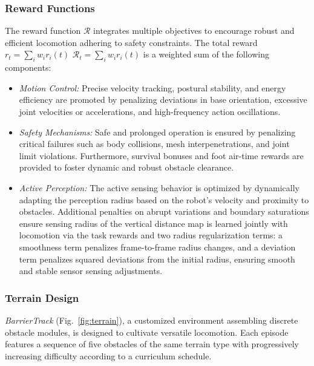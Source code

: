 \documentclass[letterpaper, 10 pt, conference]{ieeeconf/ieeeconf}
\providecommand{\DIFadd}[1]{{\protect\color{blue} \sf #1}} %
\providecommand{\DIFdel}[1]{{\protect\color{red} \scriptsize #1}} %
\providecommand{\DIFaddbegin}{} %
\providecommand{\DIFaddend}{} %
\providecommand{\DIFdelbegin}{} %
\providecommand{\DIFdelend}{} %
\begin{document}
\subsubsection{Reward Functions}
The reward function $\mathcal{R}$ integrates multiple objectives to encourage robust and efficient locomotion adhering to safety constraints. The total reward \DIFdelbegin \DIFdel{$r_t = \sum_i w_i r_i(t)$ }\DIFdelend \DIFaddbegin \DIFadd{$\mathcal{R}_t = \sum_i w_i r_i(t)$ }\DIFaddend is a weighted sum of the following components:

\begin{itemize}
    \item \textit{Motion Control:} Precise velocity tracking, postural stability, and energy efficiency are promoted by penalizing deviations in base orientation, excessive joint velocities or accelerations, and high-frequency action oscillations.

    \item \textit{Safety Mechanisms:} Safe and prolonged operation is ensured by penalizing critical failures such as body collisions, mesh interpenetrations, and joint limit violations. Furthermore, survival bonuses and foot air-time rewards are provided to foster dynamic and robust obstacle clearance.

    \item \textit{Active Perception:} The \DIFdelbegin \DIFdel{active sensing behavior is optimized by dynamically adapting the perception radius based on the robot's velocity and proximity to obstacles. Additional penalties on abrupt variations and boundary saturations ensure }\DIFdelend \DIFaddbegin \DIFadd{sensing radius of the vertical distance map is learned jointly with locomotion via the task rewards and two radius regularization terms: a smoothness term penalizes frame-to-frame radius changes, and a deviation term penalizes squared deviations from the initial radius, ensuring }\DIFaddend smooth and stable \DIFdelbegin \DIFdel{sensor }\DIFdelend \DIFaddbegin \DIFadd{sensing }\DIFaddend adjustments.
\end{itemize}

\subsubsection{Terrain Design}
\textit{BarrierTrack} (Fig.~\ref{fig:terrain}), a customized environment assembling discrete obstacle modules, is designed to cultivate versatile locomotion. Each episode features a sequence of five obstacles of the same terrain type with progressively increasing difficulty according to a curriculum schedule. 
\end{document}
